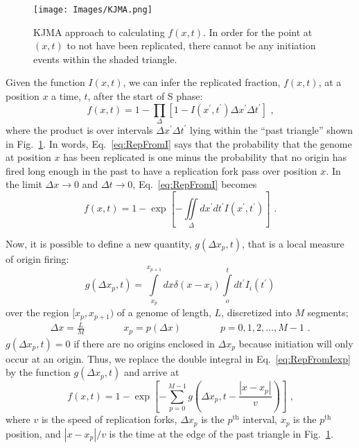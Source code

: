 		\begin{figure}[tbh]
			\begin{center}
				\texttt{[image: Images/KJMA.png]}
			\end{center}
				\caption[Replicated fraction from KJMA]{\label{fig:KJMA} KJMA approach to calculating $f(x,t)$.
					In order for the point at $(x,t)$ to not have been replicated, there cannot be any initiation events within the shaded triangle.
				}
		\end{figure}
		
		Given the function $I(x,t)$, we can infer the replicated fraction, $f(x,t)$, at a position $x$ a time, $t$, after the start of S phase:
		\begin{equation} \label{eq:RepFromI}
			f\left( x,t\right) = 1 - \prod_\Delta\left[1-I\left( x^\prime,t^\prime\right)\Delta x^\prime\Delta t^\prime\right] \text{ ,}
		\end{equation}
		where the product is over intervals $\Delta x^\prime \Delta t^\prime$ lying within the ``past triangle'' shown in Fig.~\ref{fig:KJMA}.
		In words, Eq.~\ref{eq:RepFromI} says that the probability that the genome at position $x$ has been replicated is one minus the probability that no origin has fired long enough in the past to have a replication fork pass over position $x$.
		In the limit $\Delta x\rightarrow0$ and $\Delta t\rightarrow0$, Eq.~\ref{eq:RepFromI} becomes
		\begin{equation} \label{eq:RepFromIexp}
			f\left( x,t\right) = 1 - \exp\left[-\iint\limits_\Delta dx^\prime dt^\prime I\left( x^\prime,t^\prime\right)\right] \text{ .}
		\end{equation}
		
		Now, it is possible to define a new quantity, $g(\Delta x_p,t)$, that is a local measure of origin firing:
		\begin{equation} \label{eq:LocalOriginFiring}
			g\left(\Delta x_p,t\right) = \int\limits_{x_p}^{x_{p+1}} dx \delta\left( x-x_i\right) \int\limits_o^t dt^\prime I_i\left( t^\prime\right)
		\end{equation}
		over the region $[x_p, x_{p+1})$ of a genome of length, $L$, discretized into $M$ segments;
		\begin{align}
			\Delta x = \frac{L}{M} \qquad\qquad x_p = p\left(\Delta x\right) \qquad\qquad p = 0, 1, 2, \ldots , M-1 \text{ .}
		\end{align}
		$g(\Delta x_p,t)=0$ if there are no origins enclosed in $\Delta x_p$ because initiation will only occur at an origin.
		Thus, we replace the double integral in Eq.~\ref{eq:RepFromIexp} by the function $g(\Delta x_p,t)$ and arrive at
		\begin{equation} \label{eq:RepFromG}
			f\left( x,t\right) = 1 - \exp\left[ - \sum\limits_{p=0}^{M-1}g\left(\Delta x_p,t-\frac{\left| x-x_p \right|}{v}\right)\right] \text{ ,}
		\end{equation}
		where $v$ is the speed of replication forks, $\Delta x_p$ is the $p^\text{th}$ interval, $x_p$ is the $p^\text{th}$ position, and $\left| x-x_p \right|/v$ is the time at the edge of the past triangle in Fig.~\ref{fig:KJMA}.
		
